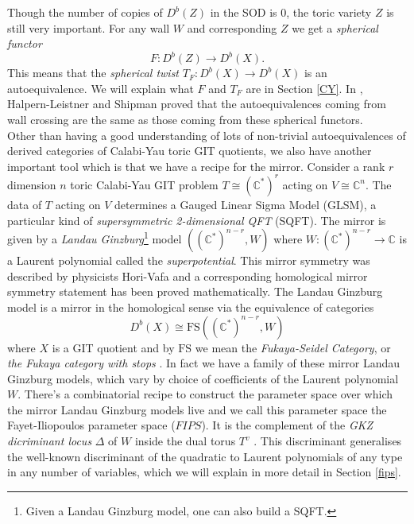 \documentclass[oneside,reqno]{amsart}
\theoremstyle{definition}
\theoremstyle{definition}
\theoremstyle{definition}
\theoremstyle{definition}
\newcommand{\CC}{\mathbb{C}}
\begin{document}
\newline
Though the number of copies of $D^b(Z)$ in the SOD is 0, the toric variety $Z$ is still very important. For any wall $W$ and corresponding $Z$ we get a \textit{spherical functor}
$$
F : D^b(Z) \to D^b(X).
$$
This means that the \textit{spherical twist} $T_F: D^b(X) \to  D^b(X) $ is an autoequivalence. We will explain what $F$ and $T_F$ are in Section \ref{CY}. In \cite{gitauto}, Halpern-Leistner and Shipman proved that the autoequivalences coming from wall crossing are the same as those coming from these spherical functors. \\
\newline
Other than having a good understanding of lots of non-trivial autoequivalences of derived categories of Calabi-Yau toric GIT quotients, we also have another important tool which is that we have a recipe for the mirror. Consider a rank $r$ dimension $n$ toric Calabi-Yau GIT problem $T \cong (\CC^*)^r$ acting on $V \cong \CC^n$. The data of $T$ acting on $V$ determines a Gauged Linear Sigma Model (GLSM), a particular kind of \textit{supersymmetric 2-dimensional QFT} (SQFT). The mirror is given by a \textit{Landau Ginzburg}\footnote{Given a Landau Ginzburg model, one can also build a SQFT.} model $(({\CC}^*)^{n-r}, W) $ where $W: ({\CC}^*)^{n-r} \to \CC$ is a Laurent polynomial called the \textit{superpotential}. This mirror symmetry was described by physicists Hori-Vafa \cite{horivafa} and a corresponding homological mirror symmetry statement has been proved mathematically. The Landau Ginzburg model is a mirror in the homological sense via the equivalence of categories
\begin{equation*}
    D^b(X) \cong \text{FS}(({\CC}^*)^{n-r}, W)
\end{equation*}
where $X$ is a GIT quotient and by $\text{FS}$ we mean the \textit{Fukaya-Seidel Category}, or \textit{the Fukaya category with stops} \cite{seidelfukaya}.
In fact we have a family of these mirror Landau Ginzburg models, which vary by choice of coefficients of the Laurent polynomial $W$. There's a combinatorial recipe to construct the parameter space over which the mirror Landau Ginzburg models live and we call this parameter space the Fayet-Iliopoulos parameter space ($FIPS$). It is the complement of the \textit{GKZ dicriminant locus} $\Delta$ of $W$ inside the dual torus $T^v$ \cite{gelfand1994discriminants}. This discriminant generalises the well-known discriminant of the quadratic to Laurent polynomials of any type in any number of variables, which we will explain in more detail in Section \ref{fips}. \\
\end{document}
